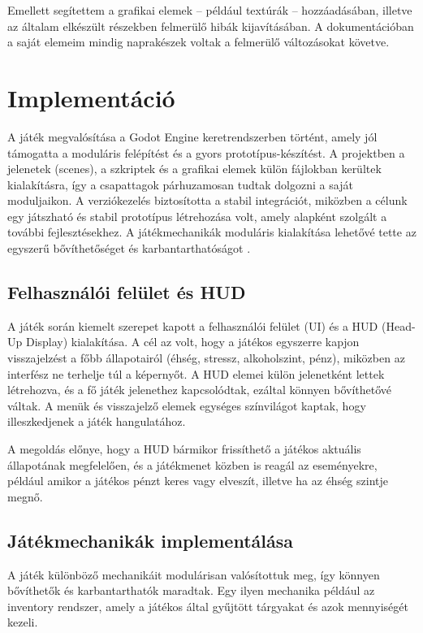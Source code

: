 \documentclass[12pt,a4paper]{article}
\begin{document}
Emellett segítettem a grafikai elemek – például textúrák – hozzáadásában, illetve az általam elkészült részekben felmerülő hibák kijavításában. A dokumentációban a saját elemeim mindig naprakészek voltak a felmerülő változásokat követve.


\section{Implementáció}

A játék megvalósítása a Godot Engine keretrendszerben történt, amely jól támogatta a moduláris felépítést és a gyors prototípus-készítést. A projektben a jelenetek (scenes), a szkriptek és a grafikai elemek külön fájlokban kerültek kialakításra, így a csapattagok párhuzamosan tudtak dolgozni a saját moduljaikon. A verziókezelés biztosította a stabil integrációt, miközben a célunk egy játszható és stabil prototípus létrehozása volt, amely alapként szolgált a további fejlesztésekhez. A játékmechanikák moduláris kialakítása lehetővé tette az egyszerű bővíthetőséget és karbantarthatóságot \cite{godot_best_practices}.

\subsection{Felhasználói felület és HUD}

A játék során kiemelt szerepet kapott a felhasználói felület (UI) és a HUD (Head-Up Display) kialakítása. A cél az volt, hogy a játékos egyszerre kapjon visszajelzést a főbb állapotairól (éhség, stressz, alkoholszint, pénz), miközben az interfész ne terhelje túl a képernyőt.  
A HUD elemei külön jelenetként lettek létrehozva, és a fő játék jelenethez kapcsolódtak, ezáltal könnyen bővíthetővé váltak. A menük és visszajelző elemek egységes színvilágot kaptak, hogy illeszkedjenek a játék hangulatához.  

A megoldás előnye, hogy a HUD bármikor frissíthető a játékos aktuális állapotának megfelelően, és a játékmenet közben is reagál az eseményekre, például amikor a játékos pénzt keres vagy elveszít, illetve ha az éhség szintje megnő.


\subsection{Játékmechanikák implementálása}

A játék különböző mechanikáit modulárisan valósítottuk meg, így könnyen bővíthetők és
karbantarthatók maradtak. Egy ilyen mechanika például az inventory rendszer, amely a
játékos által gyűjtött tárgyakat és azok mennyiségét kezeli.
\end{document}
